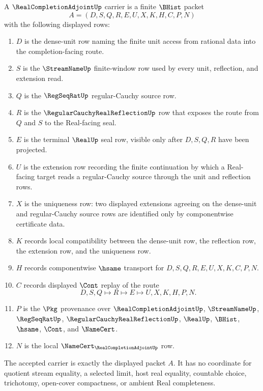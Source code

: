 \begin{definition}
\label{def:real-completion-adjoint-carrier}
A $\RealCompletionAdjointUp$ carrier is a finite $\BHist$ packet
$$
A=(D,S,Q,R,E,U,X,K,H,C,P,N)
$$
with the following displayed rows:
\begin{enumerate}
\item $D$ is the dense-unit row naming the finite unit access from rational data into the completion-facing route.
\item $S$ is the $\StreamNameUp$ finite-window row used by every unit, reflection, and extension read.
\item $Q$ is the $\RegSeqRatUp$ regular-Cauchy source row.
\item $R$ is the $\RegularCauchyRealReflectionUp$ row that exposes the route from $Q$ and $S$ to the Real-facing seal.
\item $E$ is the terminal $\RealUp$ seal row, visible only after $D,S,Q,R$ have been projected.
\item $U$ is the extension row recording the finite continuation by which a Real-facing target reads a regular-Cauchy source through the unit and reflection rows.
\item $X$ is the uniqueness row: two displayed extensions agreeing on the dense-unit and regular-Cauchy source rows are identified only by componentwise certificate data.
\item $K$ records local compatibility between the dense-unit row, the reflection row, the extension row, and the uniqueness row.
\item $H$ records componentwise $\hsame$ transport for $D,S,Q,R,E,U,X,K,C,P,N$.
\item $C$ records displayed $\Cont$ replay of the route
$$
D,S,Q \longmapsto R \longmapsto E \longmapsto U,X,K,H,P,N .
$$
\item $P$ is the $\Pkg$ provenance over $\RealCompletionAdjointUp$, $\StreamNameUp$, $\RegSeqRatUp$, $\RegularCauchyRealReflectionUp$, $\RealUp$, $\BHist$, $\hsame$, $\Cont$, and $\NameCert$.
\item $N$ is the local $\NameCert_{\RealCompletionAdjointUp}$ row.
\end{enumerate}
The accepted carrier is exactly the displayed packet $A$. It has no coordinate for quotient stream equality, a selected limit, host real equality, countable choice, trichotomy, open-cover compactness, or ambient Real completeness.
\end{definition}

